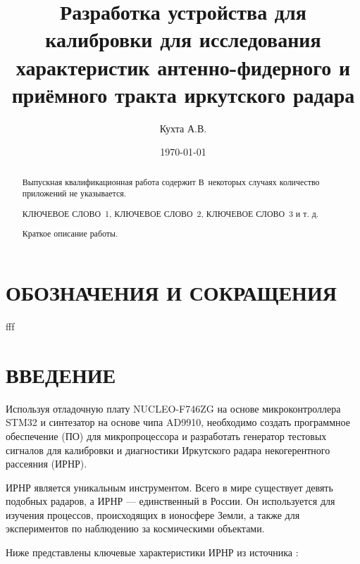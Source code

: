 \documentclass[rusmathsym, eqnumwithinsec, amspack, hyperref]{bomgost}
\author{Кухта А.В.}
\title{Разработка устройства для калибровки для исследования характеристик антенно-фидерного и приёмного тракта иркутского радара}
\date{\today}
\begin{document}
\maketitle
\thispagestyle{empty}
\newpage

\begin{abstract}
Выпускная квалификационная работа содержит \printtotpage \printtotfig \printtottab \printtotref[.] В~некоторых случаях количество приложений не указывается. 


КЛЮЧЕВОЕ СЛОВО~1, КЛЮЧЕВОЕ СЛОВО~2, КЛЮЧЕВОЕ СЛОВО~3 и т. д.

Краткое описание работы.
\end{abstract}


\tableofcontents


\section*{ОБОЗНАЧЕНИЯ И СОКРАЩЕНИЯ}
fff

%
%

\section*{ВВЕДЕНИЕ}
Используя отладочную плату NUCLEO-F746ZG на основе микроконтроллера STM32 и синтезатор на основе чипа AD9910, необходимо создать программное обеспечение (ПО) для микропроцессора и разработать генератор тестовых сигналов для калибровки и диагностики Иркутского радара некогерентного рассеяния (ИРНР).

ИРНР является уникальным инструментом. Всего в мире существует девять подобных радаров, а ИРНР — единственный в России. Он используется для изучения процессов, происходящих в ионосфере Земли, а также для экспериментов по наблюдению за космическими объектами.

Ниже представлены ключевые характеристики ИРНР из источника \cite{Kushnarev}:
\end{document}
